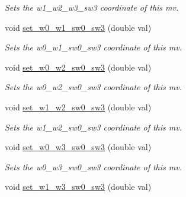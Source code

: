 \begin{DoxyCompactItemize}
\begin{DoxyCompactList}\small\item\em Sets the w1\-\_\-w2\-\_\-w3\-\_\-sw3 coordinate of this mv. \end{DoxyCompactList}\item 
\hypertarget{classe3ga_1_1mv_ae0846c907c25821a14de4eb60d0b7449}{void \hyperlink{classe3ga_1_1mv_ae0846c907c25821a14de4eb60d0b7449}{set\-\_\-w0\-\_\-w1\-\_\-sw0\-\_\-sw3} (double val)}\label{classe3ga_1_1mv_ae0846c907c25821a14de4eb60d0b7449}

\begin{DoxyCompactList}\small\item\em Sets the w0\-\_\-w1\-\_\-sw0\-\_\-sw3 coordinate of this mv. \end{DoxyCompactList}\item 
\hypertarget{classe3ga_1_1mv_ab6223fa740a939bf79bfa9809c21b5f8}{void \hyperlink{classe3ga_1_1mv_ab6223fa740a939bf79bfa9809c21b5f8}{set\-\_\-w0\-\_\-w2\-\_\-sw0\-\_\-sw3} (double val)}\label{classe3ga_1_1mv_ab6223fa740a939bf79bfa9809c21b5f8}

\begin{DoxyCompactList}\small\item\em Sets the w0\-\_\-w2\-\_\-sw0\-\_\-sw3 coordinate of this mv. \end{DoxyCompactList}\item 
\hypertarget{classe3ga_1_1mv_a02b59f43ee10332fad413d773975faa4}{void \hyperlink{classe3ga_1_1mv_a02b59f43ee10332fad413d773975faa4}{set\-\_\-w1\-\_\-w2\-\_\-sw0\-\_\-sw3} (double val)}\label{classe3ga_1_1mv_a02b59f43ee10332fad413d773975faa4}

\begin{DoxyCompactList}\small\item\em Sets the w1\-\_\-w2\-\_\-sw0\-\_\-sw3 coordinate of this mv. \end{DoxyCompactList}\item 
\hypertarget{classe3ga_1_1mv_afc8137168478255b2cd8c889037ffabd}{void \hyperlink{classe3ga_1_1mv_afc8137168478255b2cd8c889037ffabd}{set\-\_\-w0\-\_\-w3\-\_\-sw0\-\_\-sw3} (double val)}\label{classe3ga_1_1mv_afc8137168478255b2cd8c889037ffabd}

\begin{DoxyCompactList}\small\item\em Sets the w0\-\_\-w3\-\_\-sw0\-\_\-sw3 coordinate of this mv. \end{DoxyCompactList}\item 
\hypertarget{classe3ga_1_1mv_a19231dab87b4f24d0281f9ad30a54d96}{void \hyperlink{classe3ga_1_1mv_a19231dab87b4f24d0281f9ad30a54d96}{set\-\_\-w1\-\_\-w3\-\_\-sw0\-\_\-sw3} (double val)}\label{classe3ga_1_1mv_a19231dab87b4f24d0281f9ad30a54d96}


\end{DoxyCompactItemize}
